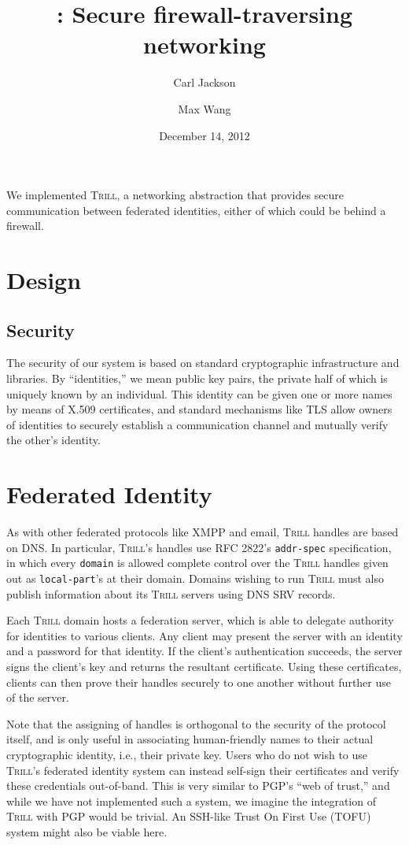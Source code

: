 \documentclass[11pt]{article}
\title{\Trill: Secure firewall-traversing networking}
\author{Carl Jackson \and Max Wang}
\date{December 14, 2012}
\newcommand{\Trill}{\textsc{Trill}\xspace}
\begin{document}
\maketitle

We implemented \Trill, a networking abstraction that provides secure
communication between federated identities, either of which could be behind a
firewall.

\section{Design}

\subsection{Security}
The security of our system is based on standard cryptographic infrastructure and
libraries. By ``identities,'' we mean public key pairs, the private half of
which is uniquely known by an individual. This identity can be given one or more
names by means of X.509 certificates, and standard mechanisms like TLS allow
owners of identities to securely establish a communication channel and mutually
verify the other's identity.

\section*{Federated Identity}
As with other federated protocols like XMPP and email, \Trill handles are based
on DNS. In particular, \Trill's handles use RFC 2822's \verb`addr-spec`
specification, in which every \verb`domain` is allowed complete control over the
\Trill handles given out as \verb`local-part`'s at their domain. Domains wishing
to run \Trill must also publish information about its \Trill servers using DNS
SRV records.

Each \Trill domain hosts a federation server, which is able to delegate
authority for identities to various clients.  Any client may present the server
with an identity and a password for that identity.  If the client's
authentication succeeds, the server signs the client's key and returns the
resultant certificate.  Using these certificates, clients can then prove their
handles securely to one another without further use of the server.

Note that the assigning of handles is orthogonal to the security of the protocol
itself, and is only useful in associating human-friendly names to their actual
cryptographic identity, i.e., their private key. Users who do not wish to use
\Trill's federated identity system can instead self-sign their certificates and
verify these credentials out-of-band. This is very similar to PGP's ``web of
trust,'' and while we have not implemented such a system, we imagine the
integration of \Trill with PGP would be trivial. An SSH-like Trust On First Use
(TOFU) system might also be viable here.
\end{document}
